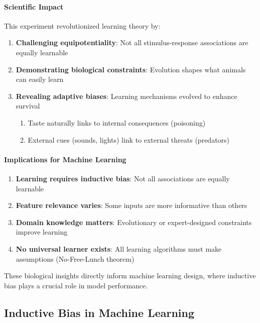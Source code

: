 \paragraph{Scientific Impact}
\label{para:garcia-impact}

This experiment revolutionized learning theory by:

\begin{enumerate}
\item \textbf{Challenging equipotentiality}: Not all stimulus-response associations are equally learnable
\item \textbf{Demonstrating biological constraints}: Evolution shapes what animals can easily learn
\item \textbf{Revealing adaptive biases}: Learning mechanisms evolved to enhance survival
\begin{enumerate}
\item Taste naturally links to internal consequences (poisoning)
\item External cues (sounds, lights) link to external threats (predators)
\end{enumerate}
\end{enumerate}

\paragraph{Implications for Machine Learning}
\label{para:garcia-implications}

\begin{enumerate}
\item \textbf{Learning requires inductive bias}: Not all associations are equally learnable
\item \textbf{Feature relevance varies}: Some inputs are more informative than others  
\item \textbf{Domain knowledge matters}: Evolutionary or expert-designed constraints improve learning
\item \textbf{No universal learner exists}: All learning algorithms must make assumptions (No-Free-Lunch theorem)
\end{enumerate}

These biological insights directly inform machine learning design, where inductive bias plays a crucial role in model performance.

\subsection{Inductive Bias in Machine Learning}
\label{subsec:inductive-bias-ml}

